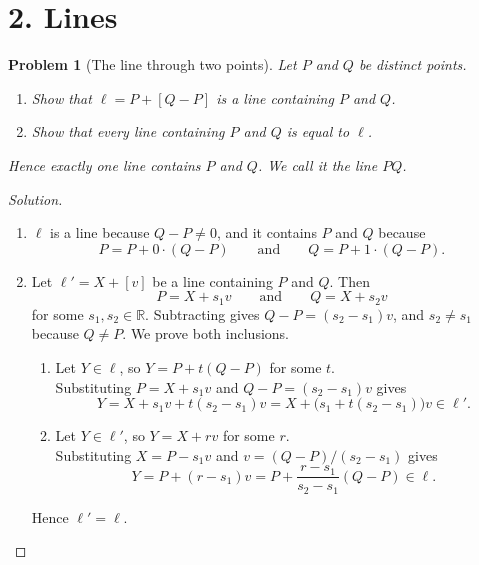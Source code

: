 \documentclass[11pt,a4paper]{article}
\theoremstyle{boxed}
\newtheorem{problem}{Problem}
\theoremstyle{definition}
\newenvironment{solution}{\begin{proof}[Solution]}{\end{proof}}
\newenvironment{plate}{\par\medskip\noindent\begin{minipage}{\linewidth}\centering}{\end{minipage}\par\medskip}
\newcommand{\R}{\mathbb{R}}
\begin{document}
\section*{2. Lines}

\begin{problem}[The line through two points]\label{p:two-points}
Let $P$ and $Q$ be distinct points.
\begin{enumerate}
    \item Show that $\ell=P+[Q-P]$ is a line containing $P$ and $Q$.
    \item Show that every line containing $P$ and $Q$ is equal to $\ell$.
\end{enumerate}
Hence exactly one line contains $P$ and $Q$. We call it the line $PQ$.
\end{problem}

\begin{solution}
\leavevmode
\begin{enumerate}
    \item $\ell$ is a line because $Q-P\neq0$, and it contains $P$ and $Q$ because
    \[
    P=P+0\cdot(Q-P) \qquad\text{and}\qquad Q=P+1\cdot(Q-P).
    \]
    \item Let $\ell'=X+[v]$ be a line containing $P$ and $Q$. Then
    \[
    P=X+s_1v \qquad\text{and}\qquad Q=X+s_2v
    \]
    for some $s_1,s_2\in\R$. Subtracting gives $Q-P=(s_2-s_1)v$, and $s_2\neq s_1$ because $Q\neq P$. We prove both inclusions.
    \begin{enumerate}[leftmargin=2.5em]
        \item[($\subseteq$)] Let $Y\in\ell$, so $Y=P+t(Q-P)$ for some $t$.\\
        Substituting $P=X+s_1v$ and $Q-P=(s_2-s_1)v$ gives
        \[
        Y=X+s_1v+t(s_2-s_1)v=X+\bigl(s_1+t(s_2-s_1)\bigr)v\in\ell'.
        \]
        \item[($\supseteq$)] Let $Y\in\ell'$, so $Y=X+rv$ for some $r$.\\
        Substituting $X=P-s_1v$ and $v=(Q-P)/(s_2-s_1)$ gives
        \[
        Y=P+(r-s_1)v=P+\frac{r-s_1}{s_2-s_1}(Q-P)\in\ell.
        \]
    \end{enumerate}
    Hence $\ell'=\ell$. \qedhere
\end{enumerate}
\end{solution}

\begin{plate}
\end{plate}
\end{document}
